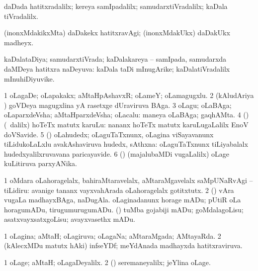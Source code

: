 \bentry
{}
\gl{\kirxvi}
\bmng
daDada hatitxradalilx; kereya samIpadalilx; samudarxtiVradalilx; kaDala tiVradalilx. 
\emng

\noindent 
\gl{\pagu}
\bmng
{} (inonxMdakikxMta) daDakekx hatitxravAgi; (inonxMdakUkx) daDakUkx madheyx. 
\emng
\eentry

\bentry
{}
\gl{\gu}
\bmng
kaDalataDiya; samudarxtiVrada; kaDalakareya -- samIpada, samudarxda daMDeya hatitxra naDeyuva:  kaDala taDi mInugArike; kaDalatiVradalilx mInuhiDiyuvike. 
\emng
\eentry

\bentry
{}
\gl{\nA}
\bmng
\bnum
\num{1} oLagaDe; oLapakakx; aMtaHpAshavxR; oLameY; oLamagugxlu. 
\num{2} (kAludAriya \vi) goVDeya magugxlina yA rasetxge dUraviruva BAga. 
\num{3} oLagu; oLaBAga; oLaparxdeVsha; aMtaHparxdeVsha; oLacalu:  maneya oLaBAga; gaqhAMta. 
\num{4} (\AmA) (\sA\ \bava dalilx) hoTeTx matutx karuLu:  nananx hoTeTx matutx karuLugaLalilx EnoV doVSavide. 
\num{5} (\AmA) oLahudedx; oLaguTaTxnunx, oLagina viSayavanunx tiLidukoLaLxlu avakAshaviruva hudedx, sAthxna:  oLaguTaTxnunx tiLiyabalalx hudedxyalilxruvavana paricayavide. 
\num{6} (\ca) (majalubaMDi \mo vugaLalilx) oLage kuLitiruva parxyANika. 
\enum
\emng

\noindent 
\gl{\nuga}
\bmng
\bnum
\num{1}  oMdara oLahoragelalx, bahiraMtaravelalx, aMtaraMgavelalx saMpUNaRvAgi -- tiLidiru:  avanige tananx vayxvahArada oLahoragelalx gotitxtutx. 
\num{2}  (\birx) vAra \mo vugaLa madhayxBAga, naDugAla. 
  
\banum
{} oLaginadanunx horage mADu; pUtiR oLa horagumADu, tirugumurugumADu. 
 (\AmA) tuMba gojabiji mADu; goMdalagoLisu; asatxvayxsatxgoLisu; avayxvasethx mADu. 
\eanum
\numie
\enum
\emng
\eentry

\bentry
{}
\gl{\gu}
\bmng
\bnum
\num{1} oLagina; aMtaH; oLagiruva; oLagaNa; aMtaraMgada; AMtayaRda. 
\num{2} (kAlecxMDu matutx hAki) infseYDf; meYdAnada madhayxda hatitxraviruva. 
\enum
\emng
\eentry

\bentry
{}
\gl{\kirxvi}
\bmng
\bnum
\num{1} oLage; aMtaH; oLagaDeyalilx. 
\num{2} (\ashi) seremaneyalilx; jeYlina oLage. 
\enum
\emng

